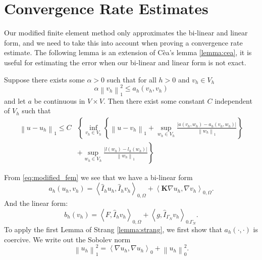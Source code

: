 \documentclass[../Main/main.tex]{subfiles}
\begin{document}
	\section{Convergence Rate Estimates}
	Our modified finite element method only approximates the bi-linear and linear form, and we need to take this into account when proving a convergence rate estimate. The following lemma is an extension of Cèa's lemma \ref{lemma:cea}, it is useful for estimating the error when our bi-linear and linear form is not exact.
	\begin{lemma}\label{lemma:strang}
		Suppose there exists some $\alpha>0$ such that for all $h>0$ and $v_h\in V_h$
		\begin{equation*}
			\alpha \left \| v_h \right \|^2_1 \leq a_h(v_h,v_h) 
		\end{equation*}
		and let $a$ be continuous in $V\times V$. Then there exist some constant $C$ independent of $V_h$ such that
		\begin{equation}\label{eq:strang_ineq}
			\begin{aligned}
				\left \| u-u_h \right \|_1 \leq C&\left \{ \inf_{v_h \in V_h}\left \{ \left \| u-v_h \right \|_1 +  \sup_{w_h\in V_h}\frac{|a(v_h,w_h)-a_h(v_h,w_h)|}{\left \| w_h \right  \|_1}\right \}   \right. \\ 
				&+\left. \sup_{w_h\in V_h}\frac{|l(w_h)-l_h(w_h)|}{\left \| w_h \right \|_1}    \right \}			
			\end{aligned}
		\end{equation}
	\end{lemma}
	From \eqref{eq:modified_fem} we see that we have a bi-linear form 
	\begin{equation}
		a_h(u_h,v_h) = \left \langle \hat{I}_h u_h, \hat{I}_h v_h \right \rangle_{0,\Omega} +  \left \langle\bm{K} \nabla u_h, \nabla v_h \right \rangle_{0,\Omega}.
	\end{equation}
	And the linear form:
	\begin{equation}
		b_h(v_h)= \left \langle F,\hat{I}_h v_h \right \rangle_{0,\Omega} + \left \langle g,\hat{I}_{\Gamma_N} v_h \right \rangle_{0.\Gamma_N}.
	\end{equation}
	To apply the first Lemma of Strang \ref{lemma:strang}, we first show that $a_h(\cdot,\cdot)$ is coercive. We write out the Sobolev norm
	\begin{equation}
			\left \| u_h \right \|_1^2  = \left \langle \nabla u_h,\nabla u_h \right \rangle_0 + \left \| u_h \right \|_0^2. 
		\end{equation}
\end{document}
